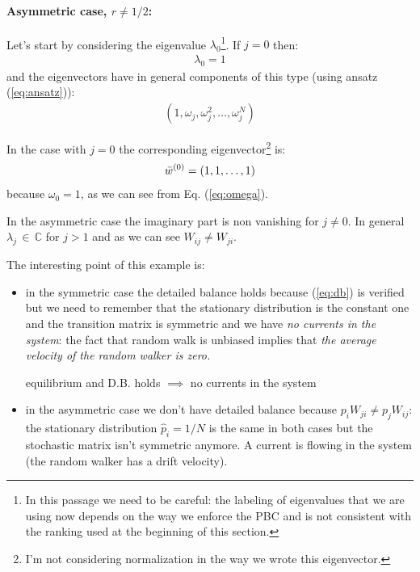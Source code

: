 \documentclass[\main/main.tex]{subfiles}
\begin{document}
\paragraph{Asymmetric case, $r\neq1/2$:}
Let's start by considering the eigenvalue $\lambda_0$\footnote{In this passage we need to be careful: the labeling of eigenvalues that we are using now depends on the way we enforce the PBC and is not consistent with the ranking used at the beginning of this section.}. If $j=0$ then:
\begin{eqnarray}
  \lambda_0 = 1
\end{eqnarray}
and the eigenvectors have in general components of this type (using ansatz (\ref{eq:ansatz})):
\begin{eqnarray}
 (1,\omega_j,\omega_j^2,\dots,\omega_j^N)
\end{eqnarray}

In the case with $j=0$ the corresponding eigenvector\footnote{I'm not considering normalization in the way we wrote this eigenvector.} is:
\begin{eqnarray}
    \Bar{w}^{(0)}=(1,1,\dots,1)
\end{eqnarray}
because $\omega_0=1$, as we can see from Eq. (\ref{eq:omega}). 

In the asymmetric case the imaginary part is non vanishing for $j\neq0$. In general $\lambda_j\, \in\, \mathbb{C}$ for $j>1$ and as we can see $W_{ij}\neq W_{ji}$.

The interesting point of this example is:
\begin{itemize}
    \item in the symmetric case the detailed balance holds because (\ref{eq:db}) is verified but we need to remember that the stationary distribution is the constant one and the transition matrix is symmetric and we have \textit{no currents in the system}: the fact that random walk is unbiased implies that \textit{the average velocity of the random walker is zero.}
    \begin{center}
        equilibrium and D.B. holds $\implies$ no currents in the system
    \end{center}
    \item in the asymmetric case we don't have detailed balance because $p_i{W_{
    ji}}\neq{p_j W_{ij}}$: the stationary distribution $\hat{p}_i=1/N$ is the same in both cases but the stochastic matrix isn't symmetric anymore. A current is flowing in the system (the random walker has a drift velocity).
\end{itemize}
\end{document}
